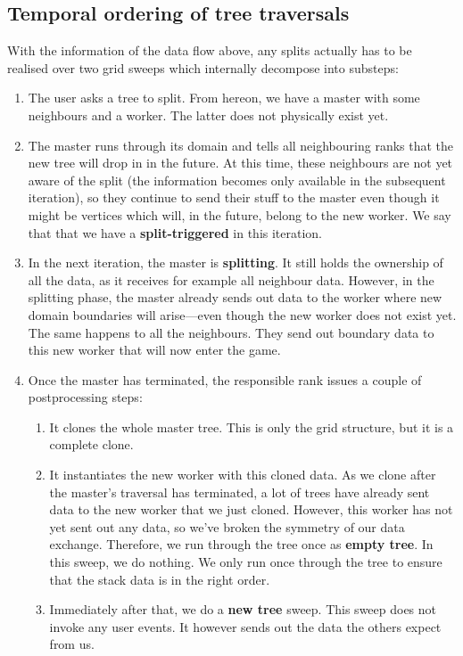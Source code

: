 \subsection{Temporal ordering of tree traversals}

With the information of the data flow above, any splits actually has to be
realised over two grid sweeps which internally decompose into substeps:

\begin{enumerate}
  \item The user asks a tree to split. From hereon, we have a master with some
  neighbours and a worker. The latter does not physically exist yet.
  \item The master runs through its domain and tells all neighbouring ranks that
  the new tree will drop in in the future. At this time, these neighbours are
  not yet aware of the split (the information becomes only available in the
  subsequent iteration), so they continue to send their stuff to the master even
  though it might be vertices which will, in the future, belong to the new
  worker. We say that that we have a {\bf split-triggered} in this iteration.
  \item In the next iteration, the master is {\bf splitting}. It still holds the
  ownership of all the data, as it receives for example all neighbour data.
  However, in the splitting phase, the master already sends out data to the
  worker where new domain boundaries will arise---even though the new worker
  does not exist yet. The same happens to all the neighbours. They send out
  boundary data to this new worker that will now enter the game.
  \item Once the master has terminated, the responsible rank issues a couple of
  postprocessing steps:
  \begin{enumerate}
    \item It clones the whole master tree. This is only the grid structure, but
    it is a complete clone.
    \item It instantiates the new worker with this cloned data. As we clone
    after the master's traversal has terminated, a lot of trees have already
    sent data to the new worker that we just cloned. However, this worker has
    not yet sent out any data, so we've broken the symmetry of our data
    exchange. Therefore, we run through the tree once as {\bf empty tree}. In
    this sweep, we do nothing. We only run once through the tree to ensure
    that the stack data is in the right order.
    \item Immediately after that, we do a {\bf new tree} sweep. This sweep does
    not invoke any user events. It however sends out the data the others expect
    from us.
  \end{enumerate}
\end{enumerate}


